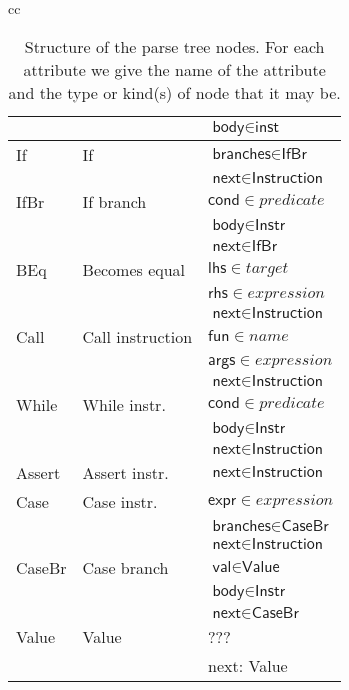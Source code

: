 \documentclass{article}
\begin{document}
\begin{table}
\begin{center}
\begin{tabular}[t]{cc}
\begin{tabular}[t]{|l|l|l|}
        & & $\textsf{body} \in \textsf{inst}$ \\
        \hline
        \textsf{If} & If & $\textsf{branches} \in \textsf{IfBr}$ \\
        & & $\textsf{next} \in \textsf{Instruction}$ \\
        \hline
        \textsf{IfBr} & If branch & $ \textsf{cond}\in predicate $ \\
        & & $\textsf{body} \in \textsf{Instr}$ \\
        & & $\textsf{next} \in \textsf{IfBr}$ \\
        \hline
        \textsf{BEq} & Becomes equal & $\textsf{lhs} \in target $ \\
        & & $\textsf{rhs} \in expression $ \\
        & & $\textsf{next} \in \textsf{Instruction}$ \\
        \hline
        \textsf{Call} & Call instruction & $\textsf{fun} \in name$ \\
        & & $\textsf{args} \in expression$ \\
        & & $\textsf{next} \in \textsf{Instruction}$ \\
        \hline
        \textsf{While} & While instr. & $\textsf{cond} \in predicate $\\
        & & $\textsf{body} \in \textsf{Instr}$ \\
        & & $\textsf{next} \in \textsf{Instruction}$ \\
        \hline
        \textsf{Assert} & Assert instr. & $\textsf{next} \in \textsf{Instruction}$ \\
        \hline
        \textsf{Case} & Case instr. & $\textsf{expr} \in expression$\\
        & & $\textsf{branches} \in \textsf{CaseBr}$ \\
        & & $\textsf{next} \in \textsf{Instruction}$ \\
        \hline
        \textsf{CaseBr} & Case branch & $\textsf{val} \in \textsf{Value}$ \\
        & & $\textsf{body} \in \textsf{Instr}$ \\
        & & $\textsf{next} \in \textsf{CaseBr}$ \\
        \hline
        \textsf{Value} & Value & ??? \\
        & & \textsf{next}: \textsf{Value} \\
        \hline
      \end{tabular} \\
      \\
       \\
    \end{tabular}
    \caption{Structure of the parse tree nodes. For each attribute we give the name of the attribute and
    the type or kind(s) of node that it may be.}
    \label{tab:node-attr}
  \end{center}
\end{table}
\end{document}
